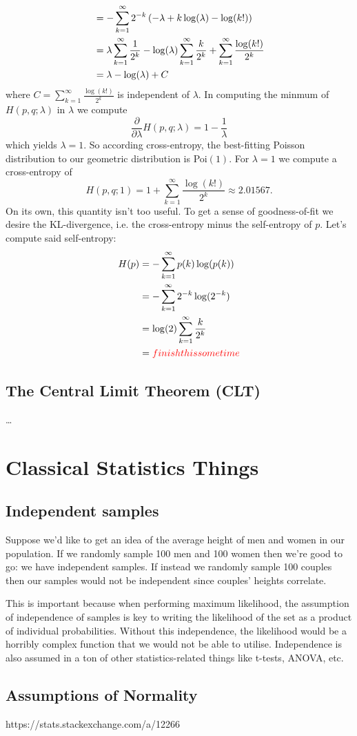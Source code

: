 \documentclass[11pt]{article}
\begin{document}
\begin{appendices}
\begin{align*}
    &=
    -\sum_{k=1}^{\infty}2^{-k}\left(-\lambda+k\log(\lambda)-\log(k!)\right)\\
    &=
    \lambda\sum_{k=1}^{\infty}\frac{1}{2^k}-\log(\lambda)\sum_{k=1}^{\infty}\frac{k}{2^k}+\sum_{k=1}^{\infty}\frac{\log(k!)}{2^k}\\
    &=
    \lambda-\log(\lambda)+C
\end{align*}
where $C=\sum_{k=1}^{\infty}\frac{\log(k!)}{2^k}$ is independent of $\lambda$. In computing the minmum of $H(p,q;\lambda)$ in $\lambda$ we compute
$$
\frac{\partial}{\partial \lambda}H(p,q;\lambda)
=
1-\frac{1}{\lambda}
$$
which yields $\lambda=1$. So according cross-entropy, the best-fitting Poisson distribution to our geometric distribution is Poi$(1)$. For $\lambda=1$ we compute a cross-entropy of
$$
H(p,q;1)
=
1+\sum_{k=1}^{\infty}\frac{\log(k!)}{2^k}
\approx
2.01567.
$$
On its own, this quantity isn't too useful. To get a sense of goodness-of-fit we desire the KL-divergence, i.e. the cross-entropy minus the self-entropy of $p$. Let's compute said self-entropy:
\begin{align*}
    H(p)
    &=
    -\sum_{k=1}^{\infty}p(k)\log(p(k))\\
    &=
    -\sum_{k=1}^{\infty}2^{-k}\log(2^{-k})\\
    &=
    \log(2)\sum_{k=1}^{\infty}\frac{k}{2^k}\\
    &=
    \textcolor{red}{finish this some time}
\end{align*}

\subsection{The Central Limit Theorem (CLT)}
\dots

\section{Classical Statistics Things}

\subsection{Independent samples}
Suppose we'd like to get an idea of the average height of men and women in our population. If we randomly sample 100 men and 100 women then we're good to go: we have independent samples. If instead we randomly sample 100 couples then our samples would not be independent since couples' heights correlate.

This is important because when performing maximum likelihood, the assumption of independence of samples is key to writing the likelihood of the set as a product of individual probabilities. Without this independence, the likelihood would be a horribly complex function that we would not be able to utilise. Independence is also assumed in a ton of other statistics-related things like t-tests, ANOVA, etc.

\subsection{Assumptions of Normality}
https://stats.stackexchange.com/a/12266

\end{appendices}
\end{document}
